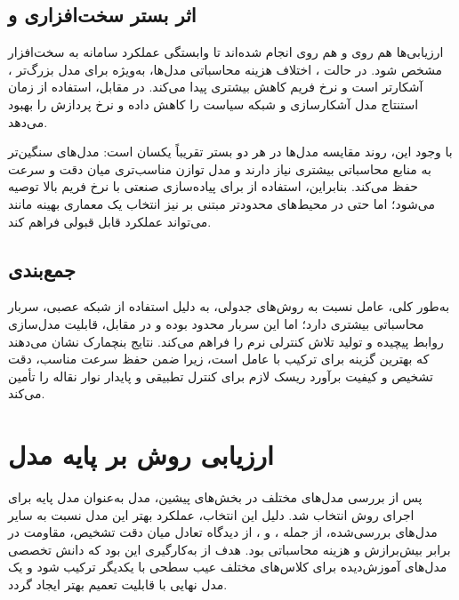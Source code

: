 \documentclass[a4paper, 10pt, twocolumn]{article}
\begin{document}
	\subsection{اثر بستر سخت‌افزاری  و }
	
	ارزیابی‌ها هم روی  و هم روی  انجام شده‌اند تا وابستگی
	عملکرد سامانه به سخت‌افزار مشخص شود. در حالت ، اختلاف هزینه
	محاسباتی مدل‌ها، به‌ویژه برای مدل بزرگ‌تر ، آشکارتر است و نرخ
	فریم کاهش بیشتری پیدا می‌کند. در مقابل، استفاده از  زمان استنتاج
	مدل آشکارسازی و شبکه سیاست  را کاهش داده و نرخ پردازش را بهبود
	می‌دهد.
	
	با وجود این، روند مقایسه مدل‌ها در هر دو بستر تقریباً یکسان است: مدل‌های
	سنگین‌تر به منابع محاسباتی بیشتری نیاز دارند و مدل
	 توازن مناسب‌تری میان دقت و سرعت حفظ می‌کند.
	بنابراین، استفاده از  برای پیاده‌سازی صنعتی با نرخ فریم بالا
	توصیه می‌شود؛ اما حتی در محیط‌های محدودتر مبتنی بر  نیز انتخاب
	یک معماری بهینه مانند  می‌تواند عملکرد قابل قبولی
	فراهم کند.
	
	\subsection{جمع‌بندی}
	
	به‌طور کلی، عامل  نسبت به روش‌های جدولی، به دلیل استفاده از شبکه
	عصبی، سربار محاسباتی بیشتری دارد؛ اما این سربار محدود بوده و در مقابل،
	قابلیت مدل‌سازی روابط پیچیده و تولید تلاش کنترلی نرم را فراهم می‌کند.
	نتایج بنچمارک نشان می‌دهند که  بهترین گزینه برای
	ترکیب با عامل  است، زیرا ضمن حفظ سرعت مناسب، دقت تشخیص و کیفیت
	برآورد ریسک لازم برای کنترل تطبیقی و پایدار نوار نقاله را تأمین می‌کند.
	
	
	\section{ارزیابی روش  بر پایه مدل }
	
	پس از بررسی مدل‌های مختلف در بخش‌های پیشین، مدل  به‌عنوان
	مدل پایه برای اجرای روش  انتخاب شد. دلیل این انتخاب، عملکرد
	بهتر این مدل نسبت به سایر مدل‌های بررسی‌شده، از جمله ،
	 و ، از دیدگاه تعادل میان دقت تشخیص، مقاومت
	در برابر بیش‌برازش و هزینه محاسباتی بود. هدف از به‌کارگیری 
	این بود که دانش تخصصی مدل‌های آموزش‌دیده برای کلاس‌های مختلف عیب سطحی
	با یکدیگر ترکیب شود و یک مدل نهایی با قابلیت تعمیم بهتر ایجاد گردد.
	
\end{document}
